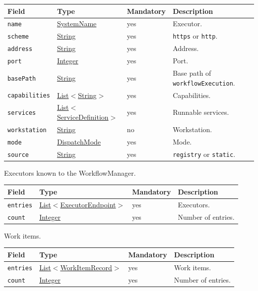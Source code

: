 \documentclass[a4paper]{arrowhead}
\newcommand{\mref}[1]{{\textcolor{ArrowheadPurple}{\hyperref[sec:model:#1]{#1}}}}
\newcommand{\pref}[1]{{\textcolor{ArrowheadGrey}{\hyperref[sec:model:primitives:#1]{#1}}}}
\begin{document}
{\small
\begin{longtable}{|p{3.7cm}|p{4.2cm}|p{1.6cm}|p{6.3cm}|}

\hline
\rowcolor{gray!33} Field & Type & Mandatory & Description \\ \hline
\endhead
\texttt{name} & \pref{SystemName} & yes & Executor. \\ \hline
\texttt{scheme} & \pref{String} & yes & \texttt{https} or \texttt{http}. \\ \hline
\texttt{address} & \pref{String} & yes & Address. \\ \hline
\texttt{port} & \pref{Integer} & yes & Port. \\ \hline
\texttt{basePath} & \pref{String} & yes & Base path of \texttt{workflowExecution}. \\ \hline
\texttt{capabilities} & \pref{List}$<$\pref{String}$>$ & yes & Capabilities. \\ \hline
\texttt{services} & \pref{List}$<$\pref{ServiceDefinition}$>$ & yes & Runnable services. \\ \hline
\texttt{workstation} & \pref{String} & no & Workstation. \\ \hline
\texttt{mode} & \mref{DispatchMode} & yes & Mode. \\ \hline
\texttt{source} & \pref{String} & yes & \texttt{registry} or \texttt{static}. \\ \hline
\end{longtable}
}

Executors known to the WorkflowManager.

{\small
\begin{longtable}{|p{3.7cm}|p{4.2cm}|p{1.6cm}|p{6.3cm}|}

\hline
\rowcolor{gray!33} Field & Type & Mandatory & Description \\ \hline
\endhead
\texttt{entries} & \pref{List}$<$\mref{ExecutorEndpoint}$>$ & yes & Executors. \\ \hline
\texttt{count} & \pref{Integer} & yes & Number of entries. \\ \hline
\end{longtable}
}

Work items.

{\small
\begin{longtable}{|p{3.7cm}|p{4.2cm}|p{1.6cm}|p{6.3cm}|}

\hline
\rowcolor{gray!33} Field & Type & Mandatory & Description \\ \hline
\endhead
\texttt{entries} & \pref{List}$<$\mref{WorkItemRecord}$>$ & yes & Work items. \\ \hline
\texttt{count} & \pref{Integer} & yes & Number of entries. \\ \hline
\end{longtable}
}
\end{document}
